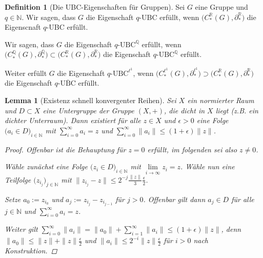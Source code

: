 \documentclass[a4paper,twoside,10pt]{scrreprt}
\newcommand{\N}{\mathbb{N}}
\newcommand{\Q}{\mathbb{Q}}
\newcommand{\R}{\mathbb{R}}
\newtheorem{lemma}[satz]{Lemma}
\theoremstyle{definition}
\newtheorem{definition}[satz]{Definition}
\begin{document}
\begin{definition}[Die UBC-Eigenschaften für Gruppen]\label{def:UBCforGroups}
Sei $G$ eine Gruppe und $q\in\N$. Wir sagen, dass $G$ die Eigenschaft $q$-UBC erfüllt, wenn $\bigl(C_*^{\R}(G),\partial_*^{\R}\bigr)$ die Eigenscnaft $q$-UBC erfüllt.\par
Wir sagen, dass $G$ die Eigenschaft $q$-$\text{UBC}^{\Q}$ erfüllt, wenn $\bigl(C_*^{\Q}(G),\partial_*^{\Q}\bigr)\subset \bigl(C_*^{\R}(G),\partial_*^{\R}\bigr)$ die Eigenschaft $q$-$\text{UBC}^{\Q}$ erfüllt.\par
Weiter erfüllt $G$ die Eigenschaft $q$-$\text{UBC}^{\ell^1}$, wenn $\bigl(C_*^{\ell^1}(G),\partial_*^{\ell^1}\bigr)\supset \bigl(C_*^{\R}(G),\partial_*^{\R}\bigr)$ die Eigenschaft $q$-$\overline{\text{UBC}}$ erfüllt.
\end{definition}

\begin{lemma}[Existenz schnell konvergenter Reihen]\label{lem:FastConvergingSeries}
Sei $X$ ein normierter Raum und $D\subset X$ eine Untergruppe der Gruppe $(X,+)$, die dicht in $X$ liegt (z.B. ein dichter Unterraum). Dann existiert für alle $z\in X$ und $\epsilon>0$ eine Folge $\bigl(a_i\in D\bigr)_{i\in\N}$ mit $\sum\limits_{i=0}^{\infty}a_i=z$ und $\sum\limits_{i=0}^{\infty}\|a_i\|\leq(1+\epsilon)\|z\|$.
\begin{proof}
Offenbar ist die Behauptung für $z=0$ erfüllt, im folgenden sei also $z\neq 0$.\par
Wähle zunächst eine Folge $\bigl(z_i\in D\bigr)_{i\in\N}$ mit $\lim\limits_{i\to\infty}z_i=z$. Wähle nun eine Teilfolge $\bigl(z_{i_j}\bigr)_{j\in\N}$ mit $\|z_{i_j}-z\|\leq 2^{-j}\frac{\|z\|}{3}\frac{\epsilon}{2}$.\par
Setze $a_0:=z_{i_0}$ und $a_j:=z_{i_j}-z_{i_{j-1}}$ für $j>0$. Offenbar gilt dann $a_j\in D$ für alle $j\in \N$ und $\sum\limits_{i=0}^{\infty}a_i=z$.\par
Weiter gilt $\sum\limits_{i=0}^{\infty}\|a_i\|=\|a_0\|+\sum\limits_{i=1}^{\infty}\|a_i\|\leq (1+\epsilon)\|z\|$, denn $\|a_0\|\leq \|z\|+\|z\|\frac{\epsilon}{2}$ und $\|a_i\|\leq 2^{-i}\|z\|\frac{\epsilon}{2}$ für $i>0$ nach Konstruktion.
\end{proof}
\end{lemma}
\end{document}
